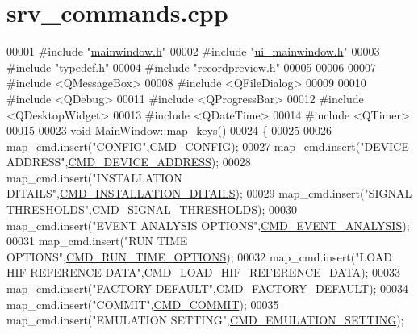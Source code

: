 \hypertarget{a00134_source}{\section{srv\+\_\+commands.\+cpp}
\label{a00134_source}
}

\begin{DoxyCode}
00001 \textcolor{preprocessor}{#include "\hyperlink{a00110}{mainwindow.h}"}
00002 \textcolor{preprocessor}{#include "\hyperlink{a00139}{ui\_mainwindow.h}"}
00003 \textcolor{preprocessor}{#include "\hyperlink{a00004}{typedef.h}"}
00004 \textcolor{preprocessor}{#include "\hyperlink{a00130}{recordpreview.h}"}
00005 
00006 
00007 \textcolor{preprocessor}{#include <QMessageBox>}
00008 \textcolor{preprocessor}{#include <QFileDialog>}
00009 
00010 \textcolor{preprocessor}{#include <QDebug>}
00011 \textcolor{preprocessor}{#include <QProgressBar>}
00012 \textcolor{preprocessor}{#include <QDesktopWidget>}
00013 \textcolor{preprocessor}{#include <QDateTime>}
00014 \textcolor{preprocessor}{#include <QTimer>}
00015 
00023 \textcolor{keywordtype}{void} MainWindow::map\_keys()
00024 \{
00025 
00026     map\_cmd.insert(\textcolor{stringliteral}{"CONFIG"},\hyperlink{a00086_aa87bfa4fccf7f7a4fc45afb1966a655f}{CMD\_CONFIG});
00027     map\_cmd.insert(\textcolor{stringliteral}{"DEVICE ADDRESS"},\hyperlink{a00086_a7c6a5f4023cb02d02f2ded23147be425}{CMD\_DEVICE\_ADDRESS});
00028     map\_cmd.insert(\textcolor{stringliteral}{"INSTALLATION DITAILS"},\hyperlink{a00086_af91ff280feea1f52e3bdd7f0f556d153}{CMD\_INSTALLATION\_DITAILS});
00029     map\_cmd.insert(\textcolor{stringliteral}{"SIGNAL THRESHOLDS"},\hyperlink{a00086_ac361dc1b32c1036394be0fd7de1182ca}{CMD\_SIGNAL\_THRESHOLDS});
00030     map\_cmd.insert(\textcolor{stringliteral}{"EVENT ANALYSIS OPTIONS"},\hyperlink{a00086_a3a15793e3ab7817f2429edf04de693a0}{CMD\_EVENT\_ANALYSIS});
00031     map\_cmd.insert(\textcolor{stringliteral}{"RUN TIME OPTIONS"},\hyperlink{a00086_a1d8673a7ca545f3e382fc538f543ab72}{CMD\_RUN\_TIME\_OPTIONS});
00032     map\_cmd.insert(\textcolor{stringliteral}{"LOAD HIF REFERENCE DATA"},\hyperlink{a00086_afc4f83cb04e57ee185a039b10e19e297}{CMD\_LOAD\_HIF\_REFERENCE\_DATA});
00033     map\_cmd.insert(\textcolor{stringliteral}{"FACTORY DEFAULT"},\hyperlink{a00086_a8ad7dae51114833acbb665d703d8ffeb}{CMD\_FACTORY\_DEFAULT});
00034     map\_cmd.insert(\textcolor{stringliteral}{"COMMIT"},\hyperlink{a00086_a7df85bf97a6a032220d7a71c78be5206}{CMD\_COMMIT});
00035     map\_cmd.insert(\textcolor{stringliteral}{"EMULATION SETTING"},\hyperlink{a00086_a230386ac00f9c01793857101e1680324}{CMD\_EMULATION\_SETTING});

\end{DoxyCode}
